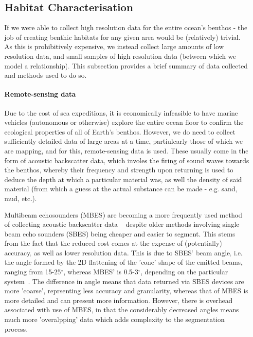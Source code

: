 \documentclass[12pt]{article}
\begin{document}
            \subsection{Habitat Characterisation}
            If we were able to collect high resolution data for the entire ocean's benthos - the job of creating benthic habitats for any given area would be (relatively) trivial. As this is prohibitively expensive, we instead collect large amounts of low resolution data, and small samples of high resolution data (between which we model a relationship). This subsection provides a brief summary of data collected and methods used to do so.


            \paragraph{Remote-sensing data}
            Due to the cost of sea expeditions, it is economically infeasible to have marine vehicles (autonomous or otherwise) explore the entire ocean floor to confirm the ecological properties of all of Earth's benthos. However, we do need to collect sufficiently detailed data of large areas at a time, partiulcarly those of which we are mapping, and for this, remote-sensing data is used. These usually come in the form of acoustic backscatter data, which involes the firing of sound waves towards the benthos, whereby their frequency and strength upon returning is used to deduce the depth at which a particular material was, as well the density of said material (from which a guess at the actual substance can be made - e.g. sand, mud, etc.).

            Multibeam echosounders (MBES) are becoming a more frequently used method of collecting acoustic backscatter data ~\citep*{calvert15} despite older methods involving single beam echo sounders (SBES) being cheaper and easier to segment. This stems from the fact that the reduced cost comes at the expense of (potentially) accuracy, as well as lower resolution data. This is due to SBES' beam angle, i.e. the angle formed by the 2D flattening of the 'cone' shape of the emitted beams, ranging from 15-25$^{\circ}$, whereas MBES' is 0.5-3$^{\circ}$, depending on the particular system~\citep*{cjbrown11}. The difference in angle means that data returned via SBES devices are more 'coarse', reprsenting less accuracy and granularity, whereas that of MBES is more detailed and can present more information. However, there is overhead associated with use of MBES, in that the considerably decreased angles means much more 'overalpping' data which adds complexity to the segmentation process.
\end{document}
